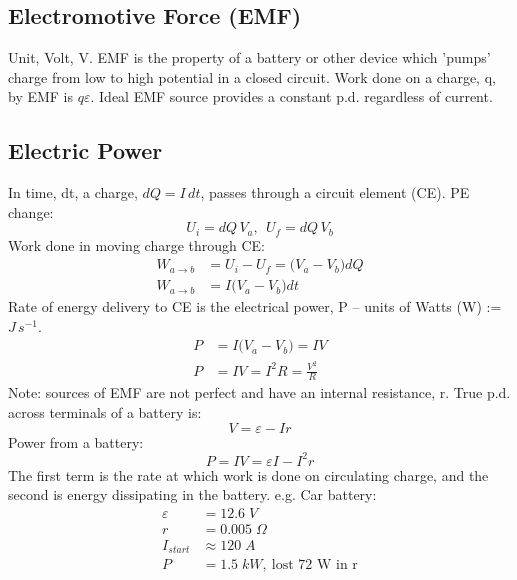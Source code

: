 \documentclass[a4paper, 11pt, normalem]{report}
\begin{document}
\chapter{}
\section{Electromotive Force (EMF)}
Unit, Volt, V.
EMF is the property of a battery or other device which 'pumps' charge from low to high potential in a closed circuit.
Work done on a charge, q, by EMF is $q\varepsilon$.
Ideal EMF source provides a constant p.d. regardless of current.

\section{Electric Power}
In time, dt, a charge, $dQ = I\,dt$, passes through a circuit element (CE).
PE change:
\begin{equation}
    U_{i} = dQ\,V_{a}, ~~ U_{f} = dQ\,V_{b}
\end{equation}
Work done in moving charge through CE:
\begin{align}
    W_{a \to b} &= U_{i} - U_{f} = \big(V_{a} - V_{b} \big)dQ \\
    W_{a \to b} &= I\big(V_{a} - V_{b} \big)dt
\end{align}
Rate of energy delivery to CE is the electrical power, P -- units of Watts (W) := $J\,s^{-1}$.
\begin{align}
    P &= I\big(V_{a} - V_{b} \big) = IV \\
    P &= IV = I^{2}R = \frac{V^{2}}{R}
\end{align}
Note: sources of EMF are not perfect and have an internal resistance, r.
True p.d. across terminals of a battery is:
\begin{equation}
    V = \varepsilon - Ir
\end{equation}
Power from a battery:
\begin{equation}
    P = IV = \varepsilon I - I^{2}r
\end{equation}
The first term is the rate at which work is done on circulating charge, and the second is energy dissipating in the battery.
e.g. Car battery:
\begin{align}
    \varepsilon &= 12.6 \; V \\
    r &= 0.005 \; \Omega \\
    I_{start} &\approx 120 \; A \\
    P &= 1.5 \; kW,~\text{lost 72 W in r}
\end{align}
\end{document}
